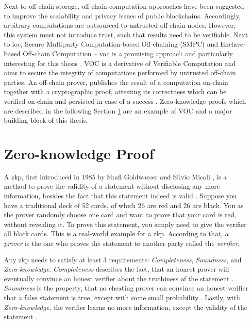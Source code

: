 Next to off-chain storage, off-chain computation approaches have been suggested to improve the scalability and privacy issues of public blockchains. Accordingly, arbitrary computations are outsourced to untrusted off-chain nodes. However, this system must not introduce trust, such that results need to be verifiable. Next to \acrfull{ioc}, Secure Multiparty Computation-based Off-chaining (SMPC) and Enclave-based Off-chain Computation -- \acrfull{voc} is a promising approach and particularly interesting for this thesis \cite{eberhardtOffchainingModelsApproaches2018}. VOC is a derivative of Verifiable Computation and aims to secure the integrity of computations performed by untrusted off-chain parties. An off-chain prover, publishes the result of a computation on-chain together with a cryptographic proof, attesting its correctness which can be verified on-chain and persisted in case of a success \cite{eberhardtOffchainingModelsApproaches2018,eberhardtZoKratesScalablePrivacyPreserving2018a,simunicVerifiableComputingApplications2021,xuSlimChainScalingBlockchain}. Zero-knowledge proofs which are described in the following Section \ref{sec:zkp} are an example of VOC and a major building block of this thesis.

\section{Zero-knowledge Proof}
\label{sec:zkp}

A \acrfull{zkp}, first introduced in 1985 by Shafi Goldwasser and Silvio Micali \cite{doi:10.1137/0218012}, is a method to prove the validity of a statement without disclosing any more information, besides the fact that this statement indeed is valid \cite{simunicVerifiableComputingApplications2021}. Suppose you have a traditional deck of 52 cards, of which 26 are red and 26 are black. You as the prover randomly choose one card and want to prove that your card is red, without revealing it. To prove this statement, you simply need to give the verifier all black cards. This is a real-world example for a \acrshort{zkp}. According to that, a \emph{prover} is the one who proves the statement to another party called the \emph{verifier}.

Any \acrshort{zkp} needs to satisfy at least 3 requirements: \emph{Completeness}, \emph{Soundness}, and \emph{Zero-knowledge}. \emph{Completeness} describes the fact, that an honest prover will eventually convince an honest verifier about the truthiness of the statement \cite{simunicVerifiableComputingApplications2021}. \emph{Soundness} is the property, that no cheating prover can convince an honest verifier that a false statement is true, except with some small probability \cite{simunicVerifiableComputingApplications2021}. Lastly, with \emph{Zero-knowledge}, the verifier learns no more information, except the validity of the statement \cite{simunicVerifiableComputingApplications2021}.

